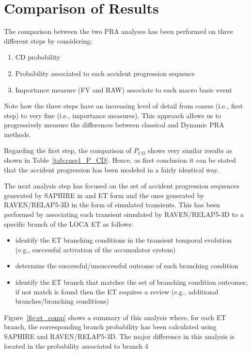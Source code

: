 \section{Comparison of Results}
\label{sec:comparison}

The comparison between the two PRA analyses has been performed on three different steps by considering:
\begin{enumerate}
	\item CD probability
	\item Probability associated to each accident progression sequence
	\item Importance measure (FV and RAW) associate to each macro basic event
\end{enumerate}
Note how the three steps have an increasing level of detail from coarse (i.e., first step) to very fine 
(i.e., importance measures).
This approach allows us to progressively measure the differences between classical and Dynamic PRA methods.

Regarding the first step, the comparison of $P_{CD}$ shows very similar results as shown in 
Table~\ref{tab:case1_P_CD}. Hence, as first conclusion it can be stated that the accident progression has been
modeled in a fairly identical way.

The next analysis step has focused on the set of accident progression sequences generated by SAPHIRE in and 
ET form and the ones generated by RAVEN/RELAP5-3D in the form of simulated transients.
This has been performed by associating each transient simulated by RAVEN/RELAP5-3D to a specific branch of the 
LOCA ET as follows:
\begin{itemize}
  \item identify the ET branching conditions in the transient temporal evolution (e.g., successful activation of 
        the accumulator system)
  \item determine the successful/unsuccessful outcome of each branching condition
  \item identify the ET branch that matches the set of branching condition outcomes; if not match is found then
        the ET requires a review (e.g., additional branches/branching conditions)
\end{itemize}

Figure~\ref{fig:et_comp} shows a summary of this analysis where, for each ET branch, the corresponding branch probability 
has been calculated using SAPHIRE and RAVEN/RELAP5-3D.
The major difference in this analysis is located in the probability associated to branch 4 

